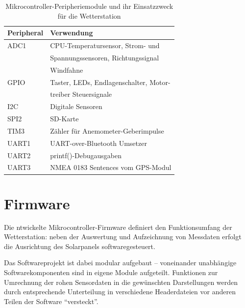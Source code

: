     \begin{table}[H]
        \centering
        \begin{tabular}{|l|l|}
            \hline
            \textbf{Peripheral} & \textbf{Verwendung}                   \\
            \hline
            ADC1                & CPU-Temperatursensor,  Strom- und     \\
                                & Spannungssensoren, Richtungssignal    \\
                                & Windfahne                             \\
            GPIO                & Taster, LEDs, Endlagenschalter, Motor-\\
                                & treiber Steuersignale                 \\
            I2C                 & Digitale Sensoren                     \\
            SPI2                & SD-Karte                              \\
            TIM3                & Zähler für Anemometer-Geberimpulse    \\
            UART1               & UART-over-Bluetooth Umsetzer          \\
            UART2               & printf()-Debugausgaben                \\
            UART3               & NMEA 0183 Sentences vom GPS-Modul     \\
            \hline
        \end{tabular}
        \caption{Mikrocontroller-Peripheriemodule und ihr Einsatzzweck für die Wetterstation}
    \end{table}    

\section{Firmware}\label{cha:C-Code}
    Die ntwickelte Mikrocontroller-Firmware definiert den Funktionsumfang der Wetterstation: neben der Auswertung und Aufzeichnung von Messdaten erfolgt die Ausrichtung des Solarpanels softwaregesteuert.
    
    Das Softwareprojekt ist dabei modular aufgebaut -- voneinander unabhängige Softwarekomponenten sind in eigene Module aufgeteilt. Funktionen zur Umrechnung der rohen Sensordaten in die gewünschten Darstellungen werden durch entsprechende Unterteilung in verschiedene Headerdateien vor anderen Teilen der Software ``versteckt''.
    
